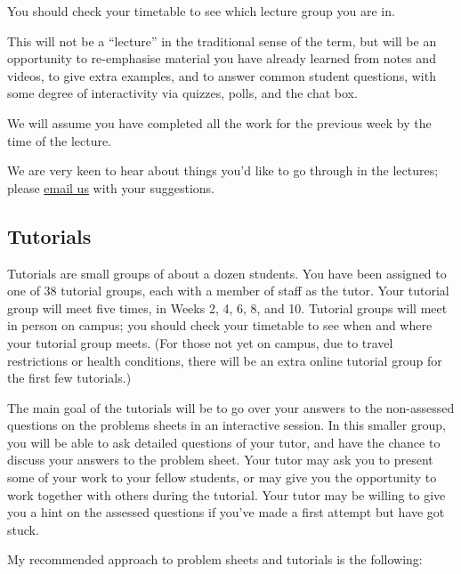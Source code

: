 \documentclass[
  a4paper,
]{book}
\theoremstyle{definition}
\theoremstyle{definition}
\theoremstyle{definition}
\theoremstyle{definition}
\theoremstyle{remark}
\begin{document}
You should check your timetable to see which lecture group you are in.

This will not be a ``lecture'' in the traditional sense of the term, but will be an opportunity to re-emphasise material you have already learned from notes and videos, to give extra examples, and to answer common student questions, with some degree of interactivity via quizzes, polls, and the chat box.

We will assume you have completed all the work for the previous week by the time of the lecture.

We are very keen to hear about things you'd like to go through in the lectures; please \href{mailto:math1710@leeds.ac.uk}{email us} with your suggestions.

\hypertarget{tutorials}{%
\subsection*{Tutorials}\label{tutorials}}

Tutorials are small groups of about a dozen students. You have been assigned to one of 38 tutorial groups, each with a member of staff as the tutor. Your tutorial group will meet five times, in Weeks 2, 4, 6, 8, and 10. Tutorial groups will meet in person on campus; you should check your timetable to see when and where your tutorial group meets. (For those not yet on campus, due to travel restrictions or health conditions, there will be an extra online tutorial group for the first few tutorials.)

The main goal of the tutorials will be to go over your answers to the non-assessed questions on the problems sheets in an interactive session. In this smaller group, you will be able to ask detailed questions of your tutor, and have the chance to discuss your answers to the problem sheet. Your tutor may ask you to present some of your work to your fellow students, or may give you the opportunity to work together with others during the tutorial. Your tutor may be willing to give you a hint on the assessed questions if you've made a first attempt but have got stuck.

My recommended approach to problem sheets and tutorials is the following:
\end{document}
